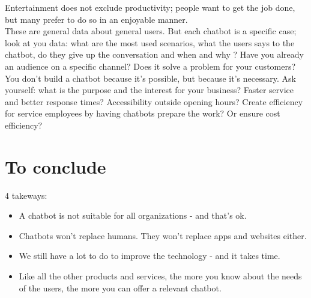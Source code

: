 \documentclass{article}
\begin{document}
Entertainment does not exclude productivity; people want to get the job done, but many prefer to do so in an enjoyable manner.\\
\break
These are general data about general users. But each chatbot is a specific case; look at you data: what are the most used scenarios, what the users says to the chatbot, do they give up the conversation and when and why ? Have you already an audience on a specific channel? Does it solve a problem for your customers?\\
\break
You don't build a chatbot because it's possible, but because it's necessary. Ask yourself: what is the purpose and the interest for your business? Faster service and better response times? Accessibility outside opening hours? Create efficiency for service employees by having chatbots prepare the work? Or ensure cost efficiency?
\section{To conclude}
4 takeways:
\begin{itemize}
    \item A chatbot is not suitable for all organizations - and that’s ok.
    \item Chatbots won’t replace humans. They won’t replace apps and websites either.
    \item We still have a lot to do to improve the technology - and it takes time.
    \item Like all the other products and services, the more you know about the needs of the users, the more you can offer a relevant chatbot.
\end{itemize}
\end{document}
